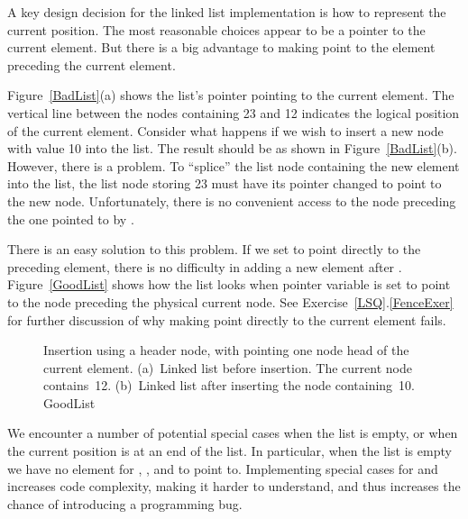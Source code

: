 A key design decision for the linked list implementation is how to
represent the current position.
The most reasonable choices appear to be a pointer to the current
element.
But there is a big advantage to making  point to the
element preceding the current element.

Figure~\ref{BadList}(a) shows the list's
 pointer pointing to the current element.
The vertical line between the nodes containing 23 and 12 indicates the
logical position of the current element.
Consider what happens if we wish to insert a new node with value 10
into the list.
The result should be as shown in Figure~\ref{BadList}(b).
However, there is a problem.
To ``splice'' the list node containing the new element
into the list, the list node storing 23 must have its
 pointer changed to point to the new node.
Unfortunately, there is no convenient access to the node preceding
the one pointed to by .

There is an easy solution to this problem.
If we set  to point directly to the preceding element,
there is no difficulty in adding a new element after .
Figure~\ref{GoodList} shows how the list looks when pointer variable
 is set to point to the node preceding the physical
current node.
See Exercise~\ref{LSQ}.\ref{FenceExer} for further discussion of why
making  point directly to the current element fails.

\begin{figure}

{Insertion
using a header node, with  pointing one node head of the
current element.
(a)~Linked list before insertion.
The current node contains~12.
(b)~Linked list after inserting the node containing~10.}
{GoodList}
\medskip
\end{figure}

We encounter a number of potential special cases when the list is
empty, or when the current position is at an end of the list.
In particular, when the list is empty we have no element for
, , and  to point to.
Implementing special cases for  and 
increases code complexity, making it harder to understand,
and thus increases the chance of introducing a programming bug.

